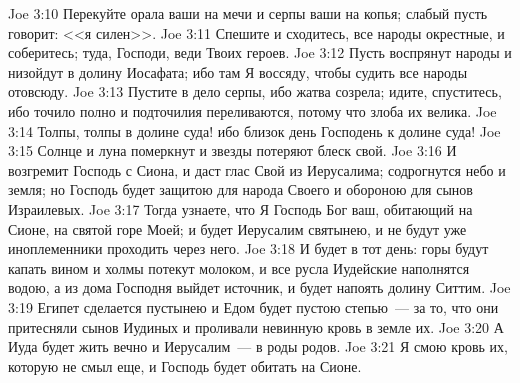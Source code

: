 \vs Joe 3:10 Перекуйте орала ваши на мечи и серпы ваши на копья; слабый пусть говорит: <<я силен>>.
\vs Joe 3:11 Спешите и сходитесь, все народы окрестные, и соберитесь; туда, Господи, веди Твоих героев.
\vs Joe 3:12 Пусть воспрянут народы и низойдут в долину Иосафата; ибо там Я воссяду, чтобы судить все народы отовсюду.
\vs Joe 3:13 Пустите в дело серпы, ибо жатва созрела; идите, спуститесь, ибо точило полно и подточилия переливаются, потому что злоба их велика.
\vs Joe 3:14 Толпы, толпы в долине суда! ибо близок день Господень к долине суда!
\vs Joe 3:15 Солнце и луна померкнут и звезды потеряют блеск свой.
\vs Joe 3:16 И возгремит Господь с Сиона, и даст глас Свой из Иерусалима; содрогнутся небо и земля; но Господь будет защитою для народа Своего и обороною для сынов Израилевых.
\vs Joe 3:17 Тогда узнаете, что Я Господь Бог ваш, обитающий на Сионе, на святой горе Моей; и будет Иерусалим святынею, и не будут уже иноплеменники проходить через него.
\vs Joe 3:18 И будет в тот день: горы будут капать вином и холмы потекут молоком, и все русла Иудейские наполнятся водою, а из дома Господня выйдет источник, и будет напоять долину Ситтим.
\vs Joe 3:19 Египет сделается пустынею и Едом будет пустою степью~--- за то, что они притесняли сынов Иудиных и проливали невинную кровь в земле их.
\vs Joe 3:20 А Иуда будет жить вечно и Иерусалим~--- в роды родов.
\vs Joe 3:21 Я смою кровь их, которую не смыл еще, и Господь будет обитать на Сионе.
